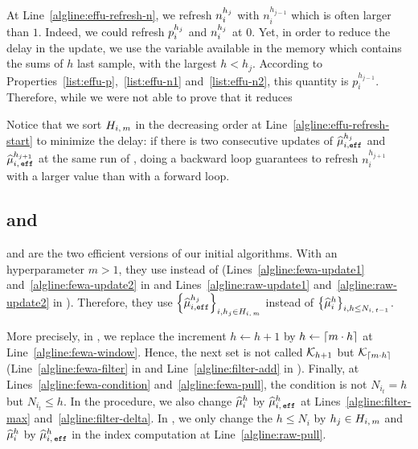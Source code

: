 \begin{remark}
At Line~\ref{algline:effu-refresh-n}, we refresh $n_i^{h_j}$ with $n_i^{h_{j-1}}$ which is often larger than $1$. Indeed, we could refresh $p_i^{h_j}$ and $n_i^{h_j}$ at $0$. Yet, in order to reduce the delay in the update, we use the variable available in the memory which contains the sums of $h$ last sample, with the largest $h< h_j$. According to Properties~\ref{list:effu-p},~\ref{list:effu-n1} and~\ref{list:effu-n2}, this quantity is $p_i^{h_{j-1}}$. Therefore, while we were not able to prove that it reduces %

Notice that we sort $H_{i,\,m}$ in the decreasing order at Line~\ref{algline:effu-refresh-start} to minimize the delay: if there is two consecutive updates of $\widehat{\mu}_{i,\texttt{eff}}^{h_j}$ and $\widehat{\mu}_{i,\, \texttt{eff}}^{h_{j+1}}$ at the same run of \EFF, doing a backward loop guarantees to refresh $n_i^{h_{j+1}}$ with a larger value than with a forward loop. 
\end{remark}


\subsection{{\EFFFEWA} and {\EFFRAW}}
{\EFFFEWA} and {\EFFRAW} are the two efficient versions of our initial algorithms. With an hyperparameter $m>1$, they use \EFF instead of \UPDATE (Lines~\ref{algline:fewa-update1} and~\ref{algline:fewa-update2} in \FEWA and Lines~\ref{algline:raw-update1} and~\ref{algline:raw-update2} in \RUCB). Therefore, they use $\left\{\widehat{\mu}_{i,\texttt{eff}}^{h_j}\right\}_{i,h_j\in H_{i,\,m}}$ instead of $\left\{\widehat{\mu}_i^h\right\}_{i,h \leq N_{i,\,t-1}}$. 

More precisely, in \FEWA, we replace the increment $h\gets h+1$ by $h\gets\left\lceil m\cdot h\right\rceil$ at Line~\ref{algline:fewa-window}. Hence, the next set is not called $\mathcal{K}_{h+1}$ but $\mathcal{K}_{\left\lceil m\cdot h\right\rceil}$ (Line~\ref{algline:fewa-filter} in \FEWA and Line~\ref{algline:filter-add} in \FILTER). Finally, at Lines~\ref{algline:fewa-condition} and~\ref{algline:fewa-pull}, the condition is not $N_{i_t}=h$ but $N_{i_t} \leq h$. In the \FILTER procedure, we also change $\widehat{\mu}_i^h$ by $\widehat{\mu}_{i,\,\texttt{eff}}^h$ at Lines~\ref{algline:filter-max} and~\ref{algline:filter-delta}. In \RUCB, we only change the $h\leq N_i$ by $h_j \in H_{i,\,m}$ and $\widehat{\mu}_i^h$ by $\widehat{\mu}_{i,\,\texttt{eff}}^h$ in the index computation at Line~\ref{algline:raw-pull}.

